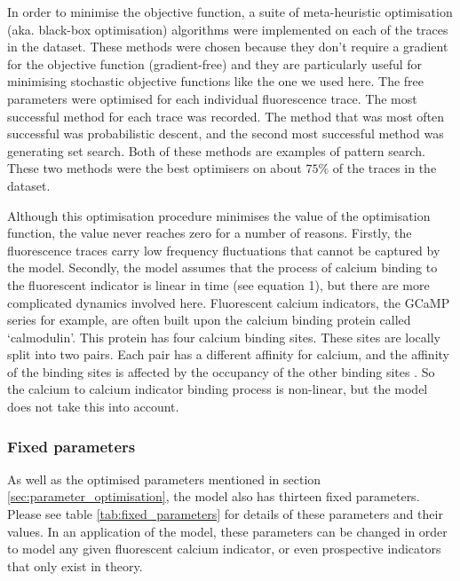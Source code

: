 In order to minimise the objective function, a suite of meta-heuristic optimisation (aka. black-box optimisation) algorithms were implemented on each of the traces in the dataset. These methods were chosen because they don’t require a gradient for the objective function (gradient-free) and they are particularly useful for minimising stochastic objective functions like the one we used here. The free parameters were optimised for each individual fluorescence trace. The most successful method for each trace was recorded. The method that was most often successful was probabilistic descent, and the second most successful method was generating set search. Both of these methods are examples of pattern search. These two methods were the best optimisers on about $75\%$ of the traces in the dataset.

Although this optimisation procedure minimises the value of the optimisation function, the value never reaches zero for a number of reasons. Firstly, the fluorescence traces carry low frequency fluctuations that cannot be captured by the model. Secondly, the model assumes that the process of calcium binding to the fluorescent indicator is linear in time (see equation 1), but there are more complicated dynamics involved here. Fluorescent calcium indicators, the GCaMP series for example, are often built upon the calcium binding protein called `calmodulin'. This protein has four calcium binding sites. These sites are locally split into two pairs. Each pair has a different affinity for calcium, and the affinity of the binding sites is affected by the occupancy of the other binding sites  \parencite{kilhoffer}. So the calcium to calcium indicator binding process is non-linear, but the model does not take this into account.

\subsubsection{Fixed parameters}
As well as the optimised parameters mentioned in section \ref{sec:parameter_optimisation}, the model also has thirteen fixed parameters. Please see table \ref{tab:fixed_parameters} for details of these parameters and their values. In an application of the model, these parameters can be changed in order to model any given fluorescent calcium indicator, or even prospective indicators that only exist in theory.

